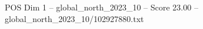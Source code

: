 \begin{textsample}{POS Dim 1 – global\_north\_2023\_10 – Score 23.00 – global\_north\_2023\_10/102927880.txt}
\end{textsample}
